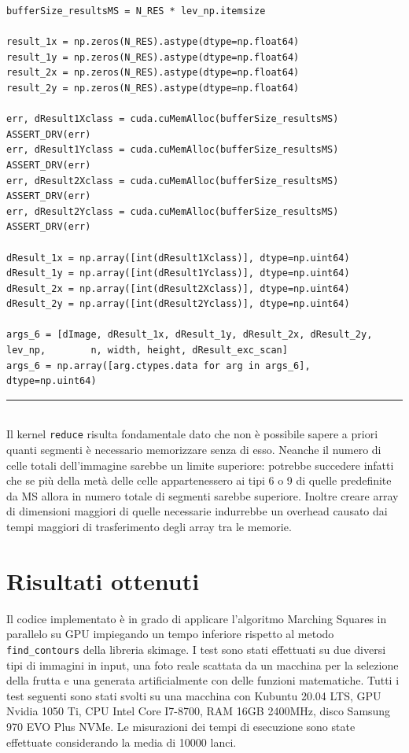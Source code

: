 \documentclass[12pt,a4paper]{report}
\begin{document}
{\begin{lstlisting}
bufferSize_resultsMS = N_RES * lev_np.itemsize

result_1x = np.zeros(N_RES).astype(dtype=np.float64)
result_1y = np.zeros(N_RES).astype(dtype=np.float64)
result_2x = np.zeros(N_RES).astype(dtype=np.float64)
result_2y = np.zeros(N_RES).astype(dtype=np.float64)

err, dResult1Xclass = cuda.cuMemAlloc(bufferSize_resultsMS)
ASSERT_DRV(err)
err, dResult1Yclass = cuda.cuMemAlloc(bufferSize_resultsMS)
ASSERT_DRV(err)
err, dResult2Xclass = cuda.cuMemAlloc(bufferSize_resultsMS)
ASSERT_DRV(err)
err, dResult2Yclass = cuda.cuMemAlloc(bufferSize_resultsMS)
ASSERT_DRV(err)

dResult_1x = np.array([int(dResult1Xclass)], dtype=np.uint64)
dResult_1y = np.array([int(dResult1Yclass)], dtype=np.uint64)
dResult_2x = np.array([int(dResult2Xclass)], dtype=np.uint64)
dResult_2y = np.array([int(dResult2Yclass)], dtype=np.uint64)

args_6 = [dImage, dResult_1x, dResult_1y, dResult_2x, dResult_2y, lev_np,        n, width, height, dResult_exc_scan]
args_6 = np.array([arg.ctypes.data for arg in args_6], dtype=np.uint64)
\end{lstlisting}
\noindent\rule[0.5ex]{\linewidth}{1pt} \\[2pt]
Il kernel \verb|reduce| risulta fondamentale dato che non è possibile sapere a priori quanti segmenti è necessario memorizzare senza di esso. Neanche il numero di celle totali dell'immagine sarebbe un limite superiore: potrebbe succedere infatti che se più della metà delle celle appartenessero ai tipi 6 o 9 di quelle predefinite da MS allora in numero totale di segmenti sarebbe superiore. Inoltre creare array di dimensioni maggiori di quelle necessarie indurrebbe un overhead causato dai tempi maggiori di trasferimento degli array tra le memorie.

\newpage

\chapter{Risultati ottenuti}
Il codice implementato è in grado di applicare l'algoritmo Marching Squares in parallelo su GPU impiegando un tempo inferiore rispetto al metodo \verb|find_contours| della libreria skimage. \newline
I test sono stati effettuati su due diversi tipi di immagini in input, una foto reale scattata da un macchina per la selezione della frutta e una generata artificialmente con delle funzioni matematiche.
Tutti i test seguenti sono stati svolti su una macchina con Kubuntu 20.04 LTS, GPU Nvidia 1050 Ti, CPU Intel Core I7-8700, RAM 16GB 2400MHz,  disco Samsung 970 EVO Plus NVMe. Le misurazioni dei tempi di esecuzione sono state effettuate considerando la media di 10000 lanci.

}
\end{document}

